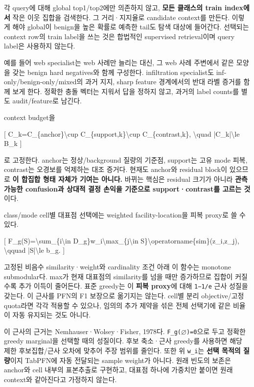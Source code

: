 각 query에 대해 global top1/\allowbreak{}top2에만 의존하지 않고, \textbf{모든 클래스의 train index에서} 작은 이웃 집합을 검색한다. 그 거리·지지율로 candidate context를 만든다. 이렇게 해야 global이 benign을 높은 확률로 예측한 tail도 탐색 대상에 들어간다. 선택되는 context row의 train label을 쓰는 것은 합법적인 supervised retrieval이며 query label은 사용하지 않는다.

예를 들어 web specialist는 web 사례만 늘리는 대신, 그 web 사례 주변에서 같은 모양을 갖는 benign hard negatives와 함께 구성한다. infiltration specialist도 inf-only/\allowbreak{}benign-only/\allowbreak{}mixed의 과거 지지, sharp feature 경계에서의 반대 라벨 증거를 함께 보게 한다. 정확한 충돌 벡터는 지워서 답을 정하지 않고, 과거의 label counts를 별도 audit/\allowbreak{}feature로 남긴다.

context budget을

[ C\_\allowbreak{}k=\allowbreak{}C\_\allowbreak{}\{anchor\}\textbackslash{}cup C\_\allowbreak{}\{support,k\}\textbackslash{}cup C\_\allowbreak{}\{contrast,k\}, \textbackslash{}quad |C\_\allowbreak{}k|\textbackslash{}le B\_\allowbreak{}k ]

로 고정한다. anchor는 정상/\allowbreak{}background 질량의 기준점, support는 고유 mode 피복, contrast는 오경보를 억제하는 대조 증거다. 현재도 anchor와 residual block이 있으므로 \textbf{이 합집합 형태 자체가 기여는 아니다.} 바뀌는 핵심은 residual 크기가 아니라 \textbf{관측 가능한 confusion과 상대적 결정 손익을 기준으로 support·contrast를 고르는 것}이다.

class/\allowbreak{}mode cell별 대표점 선택에는 weighted facility-location을 피복 proxy로 쓸 수 있다.

[ F\_\allowbreak{}g(S)=\allowbreak{}\textbackslash{}sum\_\allowbreak{}\{i\textbackslash{}in D\_\allowbreak{}g\}w\_\allowbreak{}i\textbackslash{}max\_\allowbreak{}\{j\textbackslash{}in S\}\textbackslash{}operatorname\{sim\}(z\_\allowbreak{}i,z\_\allowbreak{}j), \textbackslash{}qquad |S|\textbackslash{}le b\_\allowbreak{}g. ]

고정된 비음수 similarity·weight와 cardinality 조건 아래 이 함수는 monotone submodular다. max가 현재 대표점의 similarity를 넘을 때만 증가하므로 집합이 커질수록 추가 이득이 줄어든다. 표준 greedy는 이 \textbf{피복 proxy}에 대해 \texttt{1−1/\allowbreak{}\allowbreak{}e} 근사 성질을 갖는다. 이 근사를 PFN의 F1 보장으로 옮기지는 않는다. cell별 분리 objective/\allowbreak{}고정 quota라면 각각 적용할 수 있으나, 임의의 추가 제약을 섞은 전체 선택기에 같은 비율이 자동 유지되는 것도 아니다.

이 근사의 근거는 Nemhauser·Wolsey·Fisher, 1978다. \texttt{F\_\allowbreak{}\allowbreak{}g(\ensuremath{\varnothing})=\allowbreak{}\allowbreak{}0\allowbreak{}}으로 두고 정확한 greedy marginal을 선택할 때의 성질이다. 후보 축소·근사 greedy를 사용하면 해당 제한 후보집합/\allowbreak{}근사 오차에 맞추어 주장 범위를 줄인다. 또한 위 \texttt{w\_\allowbreak{}\allowbreak{}i}는 \textbf{선택 목적의 질량}이지 TabPFN에 자동 전달되는 sample weight가 아니다. 원래 빈도의 보존은 anchor와 cell 내부의 표본추출로 구현하고, 대표점 하나에 가중치만 붙이면 원래 context와 같아진다고 가정하지 않는다.

